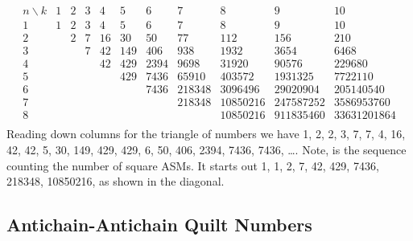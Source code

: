 \documentclass[12pt]{amsart}
\numberwithin{equation}{section}
\theoremstyle{definition}
\begin{document}
$$\begin{array}{c|cccccccccc}
   n \backslash k & 1 & 2 & 3 & 4 & 5 & 6 & 7 & 8 & 9 & 10 \\ \hline
1 & 1 & 2 & 3 & 4 & 5 & 6 & 7 & 8 & 9 & 10 \\
2 & {} & 2 & 7 & 16 & 30 & 50 & 77 & 112 & 156 & 210 \\
3 & {} & {} & 7 & 42 & 149 & 406 & 938 & 1932 & 3654 & 6468 \\
4 & {} & {} & {} & 42 & 429 & 2394 & 9698 & 31920 & 90576 & 229680 \\
5 & {} & {} & {} & {} & 429 & 7436 & 65910 & 403572 & 1931325 & 7722110 \\
6 & {} & {} & {} & {} & {} & 7436 & 218348 & 3096496 & 29020904 & 205140540 \\
7 & {} & {} & {} & {} & {} & {} & 218348 & 10850216 & 247587252 & 3586953760 \\
8 & {} & {} & {} & {} & {} & {} & {} & 10850216 & 911835460 & 33631201864 \\
\end{array}
$$
Reading down columns for the triangle of numbers we have 1, 2, 2, 3,
7, 7, 4, 16, 42, 42, 5, 30, 149, 429, 429, 6, 50, 406, 2394, 7436,
7436, \dots .  Note, \cite[A005130]{oeis} is the sequence counting the
number of square ASMs.  It starts out 1, 1, 2, 7, 42, 429, 7436,
218348, 10850216, as shown in the diagonal.





\subsection{Antichain-Antichain Quilt Numbers}
\end{document}
